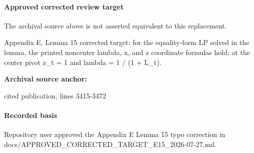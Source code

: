 \documentclass[10pt]{article}
\begin{document}
\paragraph{Approved corrected review target}
The archival source above is not asserted equivalent to this replacement.
\begin{ReviewVerbatim}
Appendix E, Lemma 15 corrected target: for the equality-form LP solved in the lemma, the printed noncenter lambda, x, and z coordinate formulas hold; at the center pivot z_t = 1 and lambda = 1 / (1 + L_t).
\end{ReviewVerbatim}

\textbf{Archival source anchor:} {\footnotesize\raggedright cited publication, lines 3415-\allowbreak{}3472\par}
\paragraph{Recorded basis}
Repository user approved the Appendix E Lemma 15 typo correction in docs/\allowbreak{}APPROVED\_\allowbreak{}CORRECTED\_\allowbreak{}TARGET\_\allowbreak{}E15\_\allowbreak{}2026-\allowbreak{}07-\allowbreak{}27.\allowbreak{}md.\allowbreak{}
\end{document}

